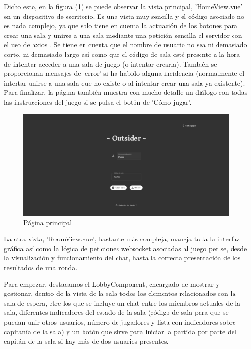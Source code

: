 Dicho esto, en la figura (\ref{fig:res_mainpage}) se puede observar la vista principal, 'HomeView.vue' en un dispositivo de escritorio. Es una vista muy sencilla y el código asociado no
es nada complejo, ya que solo tiene en cuenta la actuación de los botones para crear una sala y unirse a una sala mediante una petición sencilla al servidor con el uso de axios \cite{vueAxios}. 
Se tiene en cuenta que el nombre de usuario no sea ni demasiado corto, ni demasiado largo así como que el código de sala esté presente a la hora de intentar acceder a una sala de juego 
(o intentar crearla). También se proporcionan mensajes de 'error' si ha habido alguna incidencia (normalmente el intertar unirse a una sala que no existe o al intentar crear una sala ya existente). 
Para finalizar, la página también muestra con mucho detalle un diálogo con todas las instrucciones del juego si se pulsa el botón de 'Cómo jugar'.

\begin{figure}[h]
	\centering
	\includegraphics[width=\textwidth,clip=true]{res_mainpage.png}
	\caption{Página principal}
	\label{fig:res_mainpage}
\end{figure}

La otra vista, 'RoomView.vue', bastante más compleja, maneja toda la interfaz gráfica así como la lógica de peticiones websocket asociadas al juego per se, desde la
visualización y funcionamiento del chat, hasta la correcta presentación de los resultados de una ronda.

Para empezar, destacamos el LobbyComponent, encargado de mostrar y gestionar, dentro de la vista de la sala todos los elementos relacionados con la sala de espera, etre los que se
incluye un chat entre los miembros actuales de la sala, diferentes indicadores del estado de la sala (código de sala para que se puedan unir otros usuarios, número de jugadores y
lista con indicadores sobre capitanía de la sala) y un botón que sirve para iniciar la partida por parte del capitán de la sala si hay más de dos usuarios presentes.

